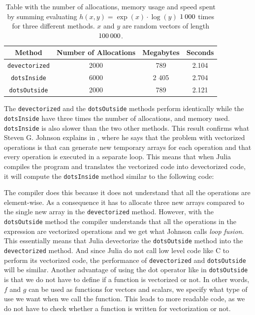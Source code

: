 \begin{table}[H]
    \centering
    \caption{Table  with  the  number  of  allocations,  memory  usage  and  speed  spent  by  summing  evaluating $h(x,y) = \exp(x)\cdot\log(y)$ $1\hspace{0.2em}000$ times for three different methods. $x$ and $y$ are random vectors of length $100\hspace{0.2em}000$.}
    \label{tab:dotOperator}
    \def\arraystretch{1.5}
    \begin{tabular}{cccc}
    \textbf{Method} & \textbf{Number of Allocations} & \textbf{Megabytes} & \textbf{Seconds} \\
        \hline
         \texttt{devectorized} & 2000 & 789 & 2.104 \\
         \texttt{dotsInside} & 6000 & 2 405 & 2.704 \\ 
         \texttt{dotsOutside} & 2000 & 789 & 2.121 \\  
         \hline
    \end{tabular}
\end{table}
The \texttt{devectorized} and the \texttt{dotsOutside} methods perform  identically while the \texttt{dotsInside} have three times the number of allocations, and memory used. \texttt{dotsInside} is also slower than the two other methods. This result confirms what Steven G. Johnson explains in \emph{\cite{MoreDotsJuliaBlog}}, where he says that the problem with vectorized operations is that can generate new temporary arrays for each operation and that every operation is executed in a separate loop. This means that when Julia compiles the program and translates the vectorized code into devectorized code, it will compute the \texttt{dotsInside} method similar to the following code:

The compiler does this because it does not understand that all the operations are element-wise. As a consequence it has to allocate three new arrays compared to the single new array in the \texttt{devectorized} method. However, with the \texttt{dotsOutside} method the compiler understands that all the operations in the expression are vectorized operations and we get what Johnson calls \textit{loop fusion}. This essentially means that Julia devectorize the \texttt{dotsOutside} method into the \texttt{devectorized} method. And since Julia do not call low level code like C to perform its vectorized code, the performance of \texttt{devectorized} and \texttt{dotsOutside} will be similar. Another advantage of using the dot operator like in \texttt{dotsOutside} is that we do not have to define if a function is vectorized or not. In other words, $f$ and $g$ can be used as functions for vectors and scalars, we specify what type of use we want when we call the function. This leads to more readable code, as we do not have to check whether a function is written for vectorization or not.


